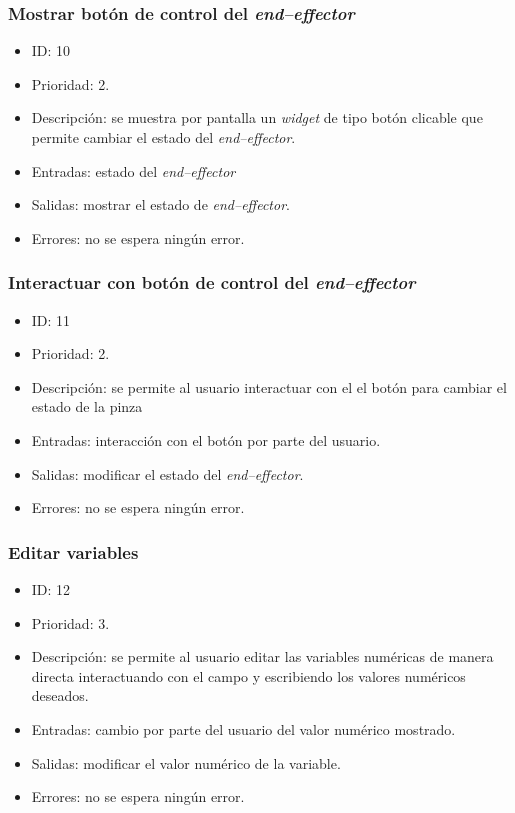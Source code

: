 \subsubsection{Mostrar botón de control del \textit{end--effector}}
\begin{itemize}
    \item ID: 10
    \item Prioridad: 2.
    \item Descripción: se muestra por pantalla un \textit{widget} de tipo botón clicable que permite cambiar el estado del \textit{end--effector}.
    \item Entradas: estado del \textit{end--effector}
    \item Salidas: mostrar el estado de \textit{end--effector}.
    \item Errores: no se espera ningún error.
\end{itemize}

\subsubsection{Interactuar con botón de control del \textit{end--effector}}
\begin{itemize}
    \item ID: 11
    \item Prioridad: 2.
    \item Descripción: se permite al usuario interactuar con el el botón para cambiar el estado de la pinza
    \item Entradas: interacción con el botón por parte del usuario.
    \item Salidas: modificar el estado del \textit{end--effector}.
    \item Errores: no se espera ningún error.
\end{itemize}

\subsubsection{Editar variables}
\begin{itemize}
    \item ID: 12
    \item Prioridad: 3.
    \item Descripción: se permite al usuario editar las variables numéricas de manera directa interactuando con el campo y escribiendo los valores numéricos deseados.
    \item Entradas: cambio por parte del usuario del valor numérico mostrado.
    \item Salidas: modificar el valor numérico de la variable.
    \item Errores: no se espera ningún error.
\end{itemize}

